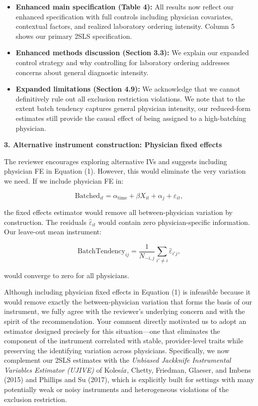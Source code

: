 \documentclass[11pt]{article}
\newcommand{\1}{\hbox{\rm 1\kern-.35em 1}}
\begin{document}
\begin{itemize}
\item \textbf{Enhanced main specification (Table 4):} All results now reflect our enhanced specification with full controls including physician covariates, contextual factors, and realized laboratory ordering intensity. Column 5 shows our primary 2SLS specification.

\item \textbf{Enhanced methods discussion (Section 3.3):} We explain our expanded control strategy and why controlling for laboratory ordering addresses concerns about general diagnostic intensity.

\item \textbf{Expanded limitations (Section 4.9):} We acknowledge that we cannot definitively rule out all exclusion restriction violations. We note that to the extent batch tendency captures general physician intensity, our reduced-form estimates still provide the causal effect of being assigned to a high-batching physician.
\end{itemize}


\textbf{3. Alternative instrument construction: Physician fixed effects}

The reviewer encourages exploring alternative IVs and suggests including physician FE in Equation (1). However, this would eliminate the very variation we need. If we include physician FE in:

\begin{equation}
\text{Batched}_{it} = \alpha_{\text{time}} + \beta X_{it} + \alpha_j + \varepsilon_{it},
\end{equation}

the fixed effects estimator would remove all between-physician variation by construction. The residuals $\hat{\varepsilon}_{it}$ would contain zero physician-specific information. Our leave-out mean instrument:

$$\text{BatchTendency}_{ij} = \frac{1}{N_{-i,j}}\sum_{i' \neq i} \hat{\varepsilon}_{i'j},$$

would converge to zero for all physicians.

Although including physician fixed effects in Equation (1) is infeasible because it would remove exactly the between-physician variation that forms the basis of our instrument, we fully agree with the reviewer’s underlying concern and with the spirit of the recommendation. Your comment directly motivated us to adopt an estimator designed precisely for this situation—one that eliminates the component of the instrument correlated with stable, provider-level traits while preserving the identifying variation across physicians. Specifically, we now complement our 2SLS estimates with the \emph{Unbiased Jackknife Instrumental Variables Estimator (UJIVE)} of Kolesár, Chetty, Friedman, Glaeser, and Imbens (2015) and Phillips and Su (2017), which is explicitly built for settings with many potentially weak or noisy instruments and heterogeneous violations of the exclusion restriction.
\end{document}
